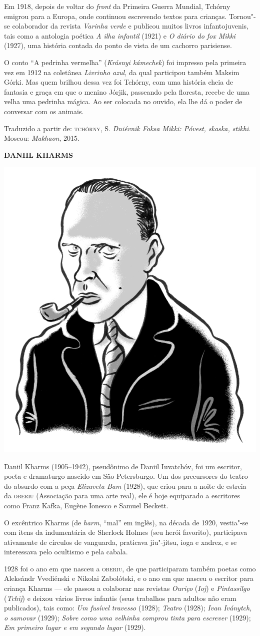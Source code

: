Em 1918, depois de voltar do \emph{front} da Primeira Guerra Mundial,
Tchórny emigrou para a Europa, onde continuou escrevendo textos para
crianças. Tornou"-se colaborador da revista \emph{Varinha verde} e
publicou muitos livros infantojuvenis, tais como a antologia poética
\emph{A ilha infantil} (1921) e \emph{O diário do fox Mikki}
(1927), uma história contada do ponto de vista de um cachorro
parisiense.

O conto ``A pedrinha vermelha'' (\emph{Krásnyi kámechek}) foi impresso
pela primeira vez em 1912 na coletânea \emph{Livrinho azul,} da qual
participou também Maksim Górki. Mas quem brilhou dessa vez foi Tchórny,
com uma história cheia de fantasia e graça em que o menino Jórjik,
passeando pela floresta, recebe de uma velha uma pedrinha mágica. Ao
ser colocada no ouvido, ela lhe dá o poder de conversar com os animais.

Traduzido a partir de:
\textsc{tchórny}, S. \emph{Dniévnik Foksa Mikki: Póvest, skaska, stikhi}. Moscou:
\emph{Makhaon}, 2015.

\pagebreak
\noindent\textbf{DANIIL KHARMS}\medskip

\noindent\includegraphics[width=.8in]{./imgs/autor12.jpg}

\noindent{}Daniil Kharms (1905--1942), pseudônimo de Daniil Iuvatchóv, foi um
escritor, poeta e dramaturgo nascido em São Petersburgo. Um dos
precursores do teatro do absurdo com a peça \emph{Elizaveta Bam} (1928),
que criou para a noite de estreia da \textsc{oberiu} (Associação para uma arte
real), ele é hoje equiparado a escritores como Franz Kafka, Eugène
Ionesco e Samuel Beckett.

O excêntrico Kharms (de \emph{harm}, ``mal'' em inglês), na década de
1920, vestia"-se com itens da indumentária de Sherlock Holmes (seu herói
favorito), participava ativamente de círculos de vanguarda, praticava
jiu"-jítsu, ioga e xadrez, e se interessava pelo ocultismo e pela cabala.

1928 foi o ano em que nasceu a \textsc{oberiu}, de que participaram também poetas
como Aleksándr Vvediénski e Nikolai Zabolótski, e o ano em que nasceu o
escritor para criança Kharms --- ele passou a colaborar nas revistas
\emph{Ouriço} (\emph{Ioj}) e \emph{Pintassilgo} (\emph{Tchij}) e deixou
vários livros infantis (seus trabalhos para adultos não eram
publicados), tais como: \emph{Um fusível travesso} (1928); \emph{Teatro}
(1928); \emph{Ivan Iványtch, o samovar} (1929); \emph{Sobre como uma
velhinha comprou tinta para escrever} (1929); \emph{Em primeiro lugar e
em segundo lugar} (1929).

